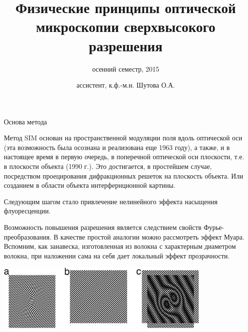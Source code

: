 \documentclass[9pt, compress, xcolor=table]{beamer}
\title{Физические принципы оптической микроскопии сверхвысокого разрешения}
\subtitle{осенний семестр, 2015}
\author{ассистент, к.ф.-м.н. Шутова О.А.}
\institute{МГУ им. М.В. Ломоносова, физический факультет}
\begin{document}
\maketitle


\begin{frame}{Основа метода}

{\small Метод SIM основан на пространственной модуляции поля вдоль оптической оси (эта возможность была осознана и реализована еще 1963 году), а также, и в настоящее время в первую очередь, в поперечной оптической оси плоскости, т.е. в плоскости объекта (1990 г.). Это достигается, в простейшем случае, посредством проецирования дифракционных решеток на плоскость объекта. Или созданием в области объекта интерфернционной картины.

Следующим шагом стало привлечение нелинейного эффекта насыщения флуоресценции.

Возможность повышения разрешения является следствием свойств Фурье-преобразования. В качестве простой аналогии можно рассмотреть эффект Муара. Вспомним, как занавеска, изготовленная из волокна с характерным диаметром волокна, при наложении сама на себя дает локальный эффект прозрачности.}

\begin{center}
\includegraphics[width=0.8\textwidth]{moire_2}
\end{center}

\end{frame}
\end{document}

